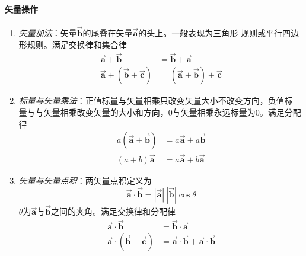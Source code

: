 \paragraph*{矢量操作}
\begin{enumerate}
    \item \textit{矢量加法}：矢量$\vec{\bm{b}}$的尾叠在矢量$\vec{\bm{a}}$的头上。一般表现为三角形
          规则或平行四边形规则。满足交换律和集合律
          \begin{align}
              \vec{\bm{a}} + \vec{\bm{b}} &= \vec{\bm{b}} + \vec{\bm{a}}
                                          \label{eq:vec-vec-add-exchang} \\
              \vec{\bm{a}} + (\vec{\bm{b}} + \vec{\bm{c}}) &= (\vec{\bm{a}} + \vec{\bm{b}}) + \vec{\bm{c}}
                                          \label{eq:vec-vec-add-combine}
          \end{align}
    \item \textit{标量与矢量乘法}：正值标量与矢量相乘只改变矢量大小不改变方向，负值标
          量与与矢量相乘改变矢量的大小和方向，$0$与矢量相乘永远标量为0。满足分配律
          \begin{equation}
              \begin{aligned}
                  a(\vec{\bm{a}} + \vec{\bm{b}}) &= a\vec{\bm{a}} + a\vec{\bm{b}} \\
                  (a + b) \vec{\bm{a}}     &= a\vec{\bm{a}} + b\vec{\bm{a}}
              \end{aligned}
            \label{eq:vec-distri}
          \end{equation}
    \item \textit{矢量与矢量点积}：两矢量点积定义为
           \begin{equation}
               \vec{\bm{a}} \cdot \vec{\bm{b}} = |\vec{\bm{a}}|\ |\vec{\bm{b}}|\cos{\theta}
            \label{eq:vec-dotproduct}
           \end{equation}
           $\theta$为$\vec{\bm{a}}$与$\vec{\bm{b}}$之间的夹角。满足交换律和分配律
           \begin{align}
               \vec{\bm{a}} \cdot \vec{\bm{b}} &= \vec{\bm{b}} \cdot \vec{\bm{a}}
                                           \label{eq:vec-vec-dot-exchange}   \\
               \vec{\bm{a}} \cdot (\vec{\bm{b}} + \vec{\bm{c}}) &= \vec{\bm{a}} \cdot \vec{\bm{b}} + \vec{\bm{a}} \cdot \vec{\bm{b}}
                                           \label{eq:vec-vec-dot-distri}
           \end{align}

\end{enumerate}
